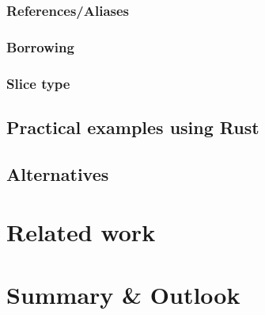 \documentclass[sigplan,11pt,nonacm]{acmart}
\begin{document}
\cite{rust-book}


\subsubsection{References/Aliases}


\cite{rust-book}

\subsubsection{Borrowing}


\cite{rust-book}


\subsubsection{Slice type}


\cite{rust-book}







\cite{rust-book}

\subsection{Practical examples using Rust}


\subsection{Alternatives}


\section{Related work}
\label{sec:relatedwork}


\section{Summary \& Outlook}
\label{sec:summary}




\end{document}
